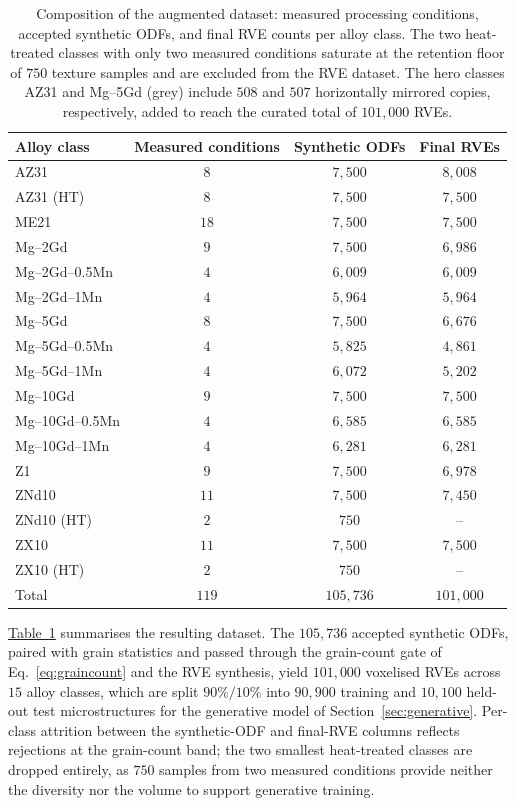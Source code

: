 \documentclass[preprint,12pt]{elsarticle}
\newcommand{\tabref}[1]{\hyperref[#1]{Table~\ref*{#1}}}
\begin{document}
\begin{table}[!t]
\centering
\caption{Composition of the augmented dataset: measured processing conditions, accepted synthetic ODFs, and final RVE counts per alloy class. The two heat-treated classes with only two measured conditions saturate at the retention floor of $750$ texture samples and are excluded from the RVE dataset. The hero classes AZ31 and Mg--5Gd (grey) include $508$ and $507$ horizontally mirrored copies, respectively, added to reach the curated total of $101{,}000$ RVEs.}
\label{tab:dataset}
\renewcommand{\arraystretch}{1.15}
\begin{tabular}{l c c c}
\toprule
Alloy class & Measured conditions & Synthetic ODFs & Final RVEs \\
\midrule
\rowcolor{gray!15}
AZ31            & $8$  & $7{,}500$ & $8{,}008$ \\
AZ31 (HT)       & $8$  & $7{,}500$ & $7{,}500$ \\
ME21            & $18$ & $7{,}500$ & $7{,}500$ \\
Mg--2Gd         & $9$  & $7{,}500$ & $6{,}986$ \\
Mg--2Gd--0.5Mn  & $4$  & $6{,}009$ & $6{,}009$ \\
Mg--2Gd--1Mn    & $4$  & $5{,}964$ & $5{,}964$ \\
\rowcolor{gray!15}
Mg--5Gd         & $8$  & $7{,}500$ & $6{,}676$ \\
Mg--5Gd--0.5Mn  & $4$  & $5{,}825$ & $4{,}861$ \\
Mg--5Gd--1Mn    & $4$  & $6{,}072$ & $5{,}202$ \\
Mg--10Gd        & $9$  & $7{,}500$ & $7{,}500$ \\
Mg--10Gd--0.5Mn & $4$  & $6{,}585$ & $6{,}585$ \\
Mg--10Gd--1Mn   & $4$  & $6{,}281$ & $6{,}281$ \\
Z1              & $9$  & $7{,}500$ & $6{,}978$ \\
ZNd10           & $11$ & $7{,}500$ & $7{,}450$ \\
ZNd10 (HT)      & $2$  & $750$     & -- \\
ZX10            & $11$ & $7{,}500$ & $7{,}500$ \\
ZX10 (HT)       & $2$  & $750$     & -- \\
\midrule
Total           & $119$ & $105{,}736$ & $101{,}000$ \\
\bottomrule
\end{tabular}
\end{table}

\tabref{tab:dataset} summarises the resulting dataset. The $105{,}736$ accepted synthetic ODFs, paired with grain statistics and passed through the grain-count gate of Eq.~\eqref{eq:graincount} and the RVE synthesis, yield $101{,}000$ voxelised RVEs across $15$ alloy classes, which are split $90\%/10\%$ into $90{,}900$ training and $10{,}100$ held-out test microstructures for the generative model of Section~\ref{sec:generative}. Per-class attrition between the synthetic-ODF and final-RVE columns reflects rejections at the grain-count band; the two smallest heat-treated classes are dropped entirely, as $750$ samples from two measured conditions provide neither the diversity nor the volume to support generative training.
\end{document}
